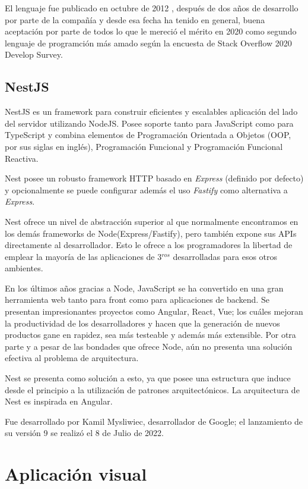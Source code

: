 El lenguaje fue publicado en octubre de 2012 , después de dos años de desarrollo por parte de la compañía y desde esa fecha ha tenido en general, buena aceptación por parte de todos lo que le mereció el mérito en 2020 como segundo lenguaje de programción más amado según la encuesta de Stack Overflow\cite{stack_overflow} 2020 Develop Survey.

\subsection{NestJS}
\cite{nestjs_doc}
NestJS es un framework para construir eficientes y escalables aplicación del lado del servidor utilizando NodeJS. Posee soporte tanto para JavaScript como para TypeScript y combina elementos de Programación Orientada a Objetos (OOP, por sus siglas en inglés), Programación Funcional y Programación Funcional Reactiva. 

Nest posee un robusto framework HTTP basado en \textit{Express} (definido por defecto) y opcionalmente se puede configurar además el uso \textit{Fastify} como alternativa a \textit{Express}.

Nest ofrece un nivel de abstracción superior al que normalmente encontramos en los demás frameworks de Node(Express/Fastify), pero también expone sus APIs directamente al desarrollador. Esto le ofrece a los programadores la libertad de emplear la mayoría de las aplicaciones de 3$^{ros}$ desarrolladas para esos otros ambientes.

En los últimos años gracias a Node, JavaScript se ha convertido en una gran herramienta web tanto para front como para aplicaciones de backend. Se presentan impresionantes proyectos como Angular, React, Vue; los cuáles mejoran la productividad de los desarrolladores y hacen que la generación de nuevos productos gane en rapidez, sea más testeable y además más extensible. Por otra parte y a pesar de las bondades que ofrece Node, aún no presenta una solución efectiva al problema de arquitectura. 

Nest se presenta como solución a esto, ya que posee una estructura que induce desde el principio a la utilización de patrones arquitectónicos. La arquitectura de Nest es inspirada en Angular.

Fue desarrollado por Kamil Mysliwiec, desarrollador de Google; el lanzamiento de su versión 9 se realizó el 8 de Julio de 2022.

\section{Aplicación visual}

